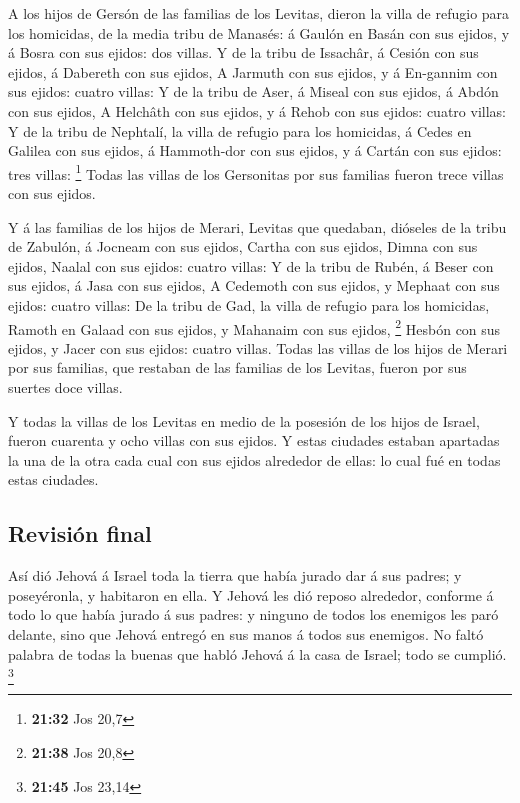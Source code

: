  A los hijos de Gersón de las familias de los Levitas,
dieron la villa de refugio para los homicidas, de la media tribu de
Manasés: á Gaulón en Basán con sus ejidos, y á Bosra con sus ejidos: dos
villas.  Y de la tribu de Issachâr, á Cesión con sus
ejidos, á Dabereth con sus ejidos,  A Jarmuth con sus
ejidos, y á En-gannim con sus ejidos: cuatro villas:  Y de
la tribu de Aser, á Miseal con sus ejidos, á Abdón con sus ejidos,
 A Helchâth con sus ejidos, y á Rehob con sus ejidos:
cuatro villas:  Y de la tribu de Nephtalí, la villa de
refugio para los homicidas, á Cedes en Galilea con sus ejidos, á
Hammoth-dor con sus ejidos, y á Cartán con sus ejidos: tres villas:
\footnote{\textbf{21:32} Jos 20,7}  Todas las villas de los
Gersonitas por sus familias fueron trece villas con sus ejidos.

 Y á las familias de los hijos de Merari, Levitas que
quedaban, dióseles de la tribu de Zabulón, á Jocneam con sus ejidos,
Cartha con sus ejidos,  Dimna con sus ejidos, Naalal con
sus ejidos: cuatro villas:  Y de la tribu de Rubén, á Beser
con sus ejidos, á Jasa con sus ejidos,  A Cedemoth con sus
ejidos, y Mephaat con sus ejidos: cuatro villas:  De la
tribu de Gad, la villa de refugio para los homicidas, Ramoth en Galaad
con sus ejidos, y Mahanaim con sus ejidos, \footnote{\textbf{21:38} Jos
  20,8}  Hesbón con sus ejidos, y Jacer con sus ejidos:
cuatro villas.  Todas las villas de los hijos de Merari por
sus familias, que restaban de las familias de los Levitas, fueron por
sus suertes doce villas.

 Y todas la villas de los Levitas en medio de la posesión
de los hijos de Israel, fueron cuarenta y ocho villas con sus ejidos.
 Y estas ciudades estaban apartadas la una de la otra cada
cual con sus ejidos alrededor de ellas: lo cual fué en todas estas
ciudades.

\hypertarget{revisiuxf3n-final}{%
\subsection{Revisión final}\label{revisiuxf3n-final}}

 Así dió Jehová á Israel toda la tierra que había jurado
dar á sus padres; y poseyéronla, y habitaron en ella.  Y
Jehová les dió reposo alrededor, conforme á todo lo que había jurado á
sus padres: y ninguno de todos los enemigos les paró delante, sino que
Jehová entregó en sus manos á todos sus enemigos.  No faltó
palabra de todas la buenas que habló Jehová á la casa de Israel; todo se
cumplió. \footnote{\textbf{21:45} Jos 23,14}

